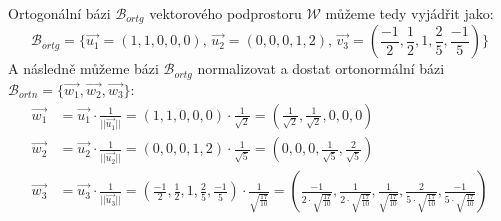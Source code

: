 \begin{example}
    Ortogonální bázi $\mathcal{B}_{ortg}$ vektorového podprostoru
    $\mathcal{W}$ můžeme tedy vyjádřit jako:
    $$\mathcal{B}_{ortg} = \{
        \vec{u_1} = (1, 1, 0, 0, 0),\,
        \vec{u_2} = (0, 0, 0, 1, 2),\,
        \vec{v_3} = (\frac{-1}{2}, \frac{1}{2}, 1, \frac{2}{5}, \frac{-1}{5})
    \}$$
    A následně můžeme bázi $\mathcal{B}_{ortg}$ normalizovat a dostat ortonormální
    bázi $\mathcal{B}_{ortn} = \{\vec{w_1}, \vec{w_2}, \vec{w_3}\}$:
    \begin{align*}
        \vec{w_1} &= \vec{u_1} \cdot \frac{1}{||\vec{u_1}||} = (1, 1, 0, 0, 0) \cdot \frac{1}{\sqrt{2}} =
            (\frac{1}{\sqrt{2}}, \frac{1}{\sqrt{2}}, 0, 0, 0)\\
        \vec{w_2} &= \vec{u_2} \cdot \frac{1}{||\vec{u_2}||} = (0, 0, 0, 1, 2) \cdot \frac{1}{\sqrt{5}} =
            (0, 0, 0, \frac{1}{\sqrt{5}}, \frac{2}{\sqrt{5}})\\
        \vec{w_3} &= \vec{u_3} \cdot \frac{1}{||\vec{u_3}||} = (\frac{-1}{2},
        \frac{1}{2}, 1, \frac{2}{5}, \frac{-1}{5}) \cdot \frac{1}{\sqrt{\frac{17}{10}}} =
        (\frac{-1}{2 \cdot \sqrt{\frac{17}{10}}}, \frac{1}{{2 \cdot \sqrt{\frac{17}{10}}}},
        \frac{1}{\sqrt{\frac{17}{10}}}, \frac{2}{5 \cdot {\sqrt{\frac{17}{10}}}}, \frac{-1}{5 \cdot {\sqrt{\frac{17}{10}}}}) \\
    \end{align*}
\end{example}


